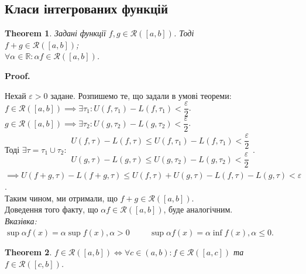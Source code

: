 \documentclass[a4paper, 10pt]{article}
\makeatletter
\def\huge{\displaystyle}
\theoremstyle{theoremdd}
\newtheorem{theorem}{Theorem}[subsection]
\theoremstyle{theoremdd}
\theoremstyle{theoremdd}
\theoremstyle{theoremdd}
\theoremstyle{theoremdd}
\theoremstyle{theoremdd}
\theoremstyle{theoremdd}
\newtheorem{remark}[theorem]{Remark}
\theoremstyle{theoremdd}
\theoremstyle{theoremdd}
\renewenvironment{proof}[1][Proof.\\]{\par
\pushQED{\hfill \qed}%
\normalfont \topsep6\p@\@plus6\p@\relax
\trivlist
\item\relax
{\bfseries
#1\@addpunct{.}}\hspace\labelsep\ignorespaces
}{%
\popQED\endtrivlist\@endpefalse
}
\makeatother
\begin{document}
\iffalse
\begin{remark}
Можна інакше переписати: $f \in \mathcal{R}([a,b]) \iff \huge\lim_{|\tau| \to 0} (U(f,\tau) - L(f,\tau)) = 0$.
\end{remark}
\fi

\subsection{Класи інтегрованих функцій}
\begin{theorem}
\label{linearity_of_integrable_functions}
Задані функції $f,g \in \mathcal{R}([a,b])$. Тоді \\
$f+g \in \mathcal{R}([a,b])$; \\
$\forall \alpha \in \mathbb{R}: \alpha f \in \mathcal{R}([a,b])$.
\end{theorem}

\begin{proof}
Нехай $\varepsilon > 0$ задане. Розпишемо те, що задали в умові теореми:\\
$f \in \mathcal{R}([a,b]) \implies \exists \tau_1: U(f,\tau_1) - L(f,\tau_1) < \dfrac{\varepsilon}{2}$.\\
$g \in \mathcal{R}([a,b]) \implies \exists \tau_2: U(g,\tau_2) - L(g,\tau_2) < \dfrac{\varepsilon}{2}$.\\
Тоді $\exists \tau = \tau_1 \cup \tau_2: \begin{gathered} U(f,\tau)-L(f,\tau) \leq U(f,\tau_1)-L(f,\tau_1) < \dfrac{\varepsilon}{2} \\
U(g,\tau)-L(g,\tau) \leq U(g,\tau_2) - L(g,\tau_2) < \dfrac{\varepsilon}{2} \end{gathered}$.\\
$\implies U(f+g,\tau) - L(f+g,\tau) \leq U(f,\tau) + U(g,\tau) - L(f,\tau) - L(g,\tau) < \varepsilon$.\\
Таким чином, ми отримали, що $f + g \in \mathcal{R}([a,b])$.
\bigskip \\
Доведення того факту, що $\alpha f \in \mathcal{R}([a,b])$, буде аналогічним.\\
\textit{Вказівка: $\huge\sup \alpha f(x) = \alpha \sup f(x), \alpha > 0 \hspace{1cm} \sup \alpha f(x) = \alpha \inf f(x), \alpha \leq 0$}.
\end{proof}

\begin{theorem}
\label{additivity_of_integrable_fucntions}
$f \in \mathcal{R}([a,b]) \iff \forall c \in (a,b): f \in \mathcal{R}([a,c])$ та $f \in \mathcal{R}([c,b])$.
\end{theorem}
\end{document}
